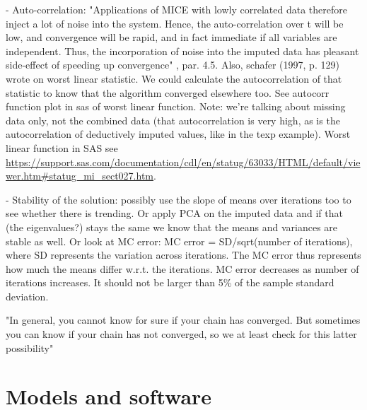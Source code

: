 \documentclass[article]{jss}
\begin{document}
- Auto-correlation: "Applications of MICE with lowly correlated data therefore inject a lot of noise into the system. Hence, the auto-correlation over t will be low, and convergence will be rapid, and in fact immediate if all variables are independent. Thus, the incorporation of noise into the imputed data has pleasant side-effect of speeding up convergence" \citep{buur18}, par. 4.5. Also, schafer (1997, p. 129) wrote on worst linear statistic. We could calculate the autocorrelation of that statistic to know that the algorithm converged elsewhere too. See autocorr function plot in sas of worst linear function. Note: we're talking about missing data only, not the combined data (that autocorrelation is very high, as is the autocorrelation of deductively imputed values, like in the texp example). Worst linear function in SAS see \url{https://support.sas.com/documentation/cdl/en/statug/63033/HTML/default/viewer.htm#statug_mi_sect027.htm}.

- Stability of the solution: possibly use the slope of means over iterations too to see whether there is trending. Or apply PCA on the imputed data and if that (the eigenvalues?) stays the same we know that the means and variances are stable as well. Or look at MC error: MC error = SD/sqrt(number of iterations), where SD represents the variation across iterations. The MC error thus represents how much the means differ w.r.t. the iterations. MC error decreases as number of iterations increases. It should not be larger than 5\% of the sample standard deviation.

"In general, you cannot know for sure if your chain has converged. But sometimes you can know if your chain has not converged, so we at least check for this latter possibility" \cite[p.~101]{hoff09}






\section{Models and software} \label{sec:models}
\end{document}
